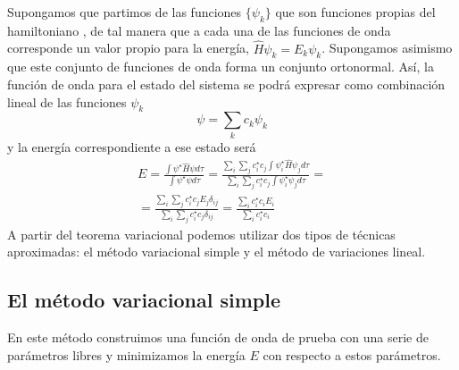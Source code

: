 Supongamos que partimos de las funciones $\{\psi_k\}$
que son funciones propias del hamiltoniano , de tal manera que
a cada una de las funciones de onda corresponde un valor propio
para la energía,
$\hat{H}\psi_k=E_k\psi_k$. Supongamos asimismo que este conjunto
de funciones de onda forma un conjunto ortonormal. Así, la función
de onda para el estado del sistema se podrá expresar como
combinación lineal de las funciones $\psi_k$
\begin{equation}
    \psi=\sum_kc_k\psi_k
\end{equation}
y la energía correspondiente a ese estado será
\begin{equation}\begin{split}
    E=\frac{\int{\psi^\star\hat{H}\psi d\tau}}{\int{\psi^\star \psi d\tau}}=  
    \frac{\sum_i\sum_jc_i^\star c_j\int{\psi_i^\star\hat{H}\psi_j d\tau}}{\sum_i\sum_jc_i^\star c_j\int{\psi_i^\star\psi_j d\tau}}= \\
 = \frac{\sum_i\sum_jc_i^\star c_jE_{j}\delta_{ij}}{\sum_i\sum_jc_i^\star c_j\delta_{ij}}=
    \frac{\sum_ic_i^\star c_iE_{i}}{\sum_ic_i^\star c_i}
\end{split}
\end{equation}
A partir del teorema variacional podemos utilizar dos tipos
de técnicas aproximadas: el método variacional simple y el 
método de variaciones lineal.

\subsection{El método variacional simple}
En este método construimos una función de onda de prueba con 
una serie de parámetros libres y minimizamos la energía $E$
con respecto a estos parámetros. 


